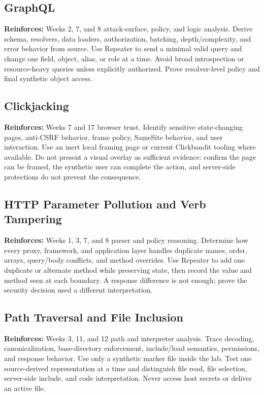 \documentclass[11pt]{article}
\begin{document}
\subsection{GraphQL}
\begin{optionalbox}
\textbf{Reinforces:} Weeks 2, 7, and 8 attack-surface, policy, and logic analysis.
Derive schema, resolvers, data loaders, authorization, batching, depth/complexity,
and error behavior from source. Use Repeater to send a minimal valid query and
change one field, object, alias, or role at a time. Avoid broad introspection or
resource-heavy queries unless explicitly authorized. Prove resolver-level policy
and final synthetic object access.
\end{optionalbox}

\subsection{Clickjacking}
\begin{optionalbox}
\textbf{Reinforces:} Weeks 7 and 17 browser trust. Identify sensitive state-changing
pages, anti-CSRF behavior, frame policy, SameSite behavior, and user interaction.
Use an inert local framing page or current Clickbandit tooling where available.
Do not present a visual overlay as sufficient evidence: confirm the page can be
framed, the synthetic user can complete the action, and server-side protections
do not prevent the consequence.
\end{optionalbox}

\subsection{HTTP Parameter Pollution and Verb Tampering}
\begin{optionalbox}
\textbf{Reinforces:} Weeks 1, 3, 7, and 8 parser and policy reasoning. Determine
how every proxy, framework, and application layer handles duplicate names, order,
arrays, query/body conflicts, and method overrides. Use Repeater to add one
duplicate or alternate method while preserving state, then record the value and
method seen at each boundary. A response difference is not enough; prove the
security decision used a different interpretation.
\end{optionalbox}

\subsection{Path Traversal and File Inclusion}
\begin{optionalbox}
\textbf{Reinforces:} Weeks 3, 11, and 12 path and interpreter analysis. Trace
decoding, canonicalization, base-directory enforcement, include/load semantics,
permissions, and response behavior. Use only a synthetic marker file inside the
lab. Test one source-derived representation at a time and distinguish file read,
file selection, server-side include, and code interpretation. Never access host
secrets or deliver an active file.
\end{optionalbox}
\end{document}
